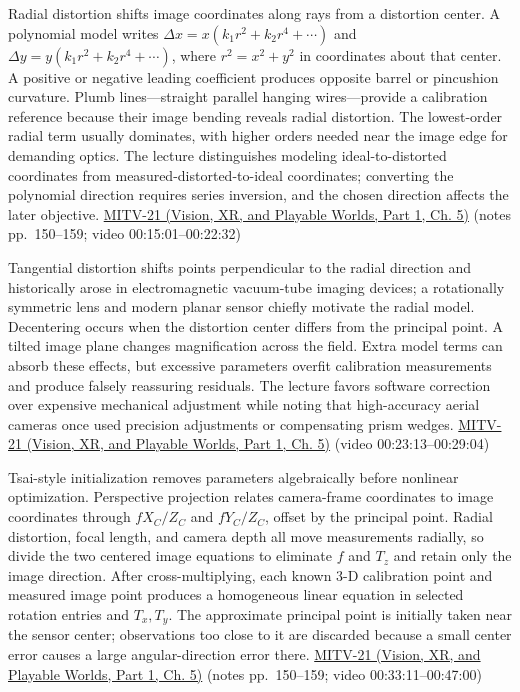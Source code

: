 Radial distortion shifts image coordinates along rays from a distortion center. A polynomial model writes \(\Delta x=x(k_1r^2+k_2r^4+\cdots)\) and \(\Delta y=y(k_1r^2+k_2r^4+\cdots)\), where \(r^2=x^2+y^2\) in coordinates about that center. A positive or negative leading coefficient produces opposite barrel or pincushion curvature. Plumb lines---straight parallel hanging wires---provide a calibration reference because their image bending reveals radial distortion. The lowest-order radial term usually dominates, with higher orders needed near the image edge for demanding optics. The lecture distinguishes modeling ideal-to-distorted coordinates from measured-distorted-to-ideal coordinates; converting the polynomial direction requires series inversion, and the chosen direction affects the later objective. \href{../07-Vision-XR-and-Playable-Worlds-P01/main.pdf\#nameddest=04-visual-computing-ii-ch036-mitv-21---relative-orientation-binocular-stereo-structure-quadrics-calibration-reprojection}{MITV-21 (Vision, XR, and Playable Worlds, Part 1, Ch. 5)} (notes pp.~150--159; video 00:15:01--00:22:32)

Tangential distortion shifts points perpendicular to the radial direction and historically arose in electromagnetic vacuum-tube imaging devices; a rotationally symmetric lens and modern planar sensor chiefly motivate the radial model. Decentering occurs when the distortion center differs from the principal point. A tilted image plane changes magnification across the field. Extra model terms can absorb these effects, but excessive parameters overfit calibration measurements and produce falsely reassuring residuals. The lecture favors software correction over expensive mechanical adjustment while noting that high-accuracy aerial cameras once used precision adjustments or compensating prism wedges. \href{../07-Vision-XR-and-Playable-Worlds-P01/main.pdf\#nameddest=04-visual-computing-ii-ch036-mitv-21---relative-orientation-binocular-stereo-structure-quadrics-calibration-reprojection}{MITV-21 (Vision, XR, and Playable Worlds, Part 1, Ch. 5)} (video 00:23:13--00:29:04)

Tsai-style initialization removes parameters algebraically before nonlinear optimization. Perspective projection relates camera-frame coordinates to image coordinates through \(fX_C/Z_C\) and \(fY_C/Z_C\), offset by the principal point. Radial distortion, focal length, and camera depth all move measurements radially, so divide the two centered image equations to eliminate \(f\) and \(T_z\) and retain only the image direction. After cross-multiplying, each known 3-D calibration point and measured image point produces a homogeneous linear equation in selected rotation entries and \(T_x,T_y\). The approximate principal point is initially taken near the sensor center; observations too close to it are discarded because a small center error causes a large angular-direction error there. \href{../07-Vision-XR-and-Playable-Worlds-P01/main.pdf\#nameddest=04-visual-computing-ii-ch036-mitv-21---relative-orientation-binocular-stereo-structure-quadrics-calibration-reprojection}{MITV-21 (Vision, XR, and Playable Worlds, Part 1, Ch. 5)} (notes pp.~150--159; video 00:33:11--00:47:00)

